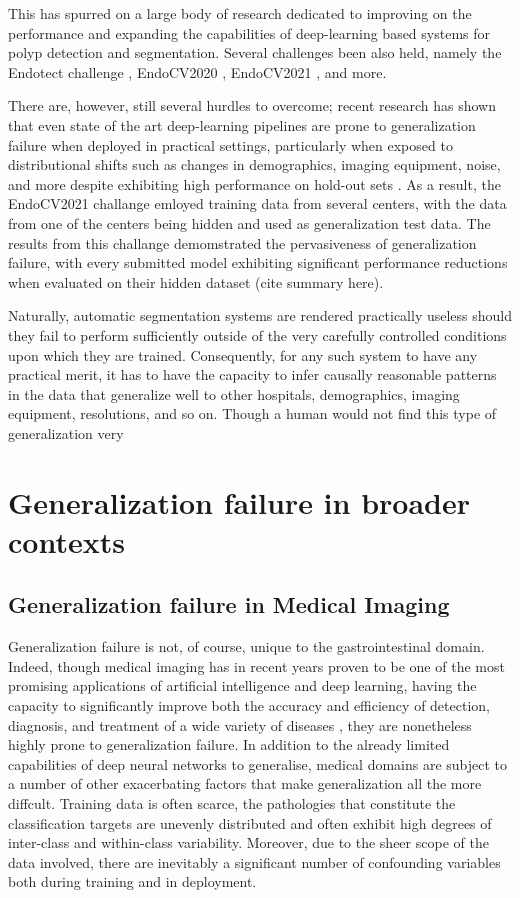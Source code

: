 	This has spurred on a large body of research dedicated to improving on the performance and expanding the capabilities of deep-learning based systems for polyp detection and segmentation. Several challenges been also held, namely the Endotect challenge \cite{endotect}, EndoCV2020 \cite{endocv2020}, EndoCV2021 \cite{endocv2021}, and more.
	
	There are, however, still several hurdles to overcome; recent research has shown that even state of the art deep-learning pipelines are prone to generalization failure when deployed in practical settings, particularly when exposed to distributional shifts such as changes in demographics, imaging equipment, noise, and more despite exhibiting high performance on hold-out sets \cite{retinopathy, damour2020underspecification, pneumonia, shortcut_learning}. As a result, the EndoCV2021 challange emloyed training data from several centers, with the data from one of the centers being hidden and used as generalization test data. The results from this challange demomstrated the pervasiveness of generalization failure, with every submitted model exhibiting significant performance reductions when evaluated on their hidden dataset (cite summary here). 
	
	Naturally, automatic segmentation systems are rendered practically useless should they fail to perform sufficiently outside of the very carefully controlled conditions upon which they are trained. Consequently, for any such system to have any practical merit, it has to have the capacity to infer causally reasonable patterns in the data that generalize well to other hospitals, demographics, imaging equipment, resolutions, and so on. Though a human would not find this type of generalization very 

\section{Generalization failure in broader contexts} \label{case_studies}
	\subsection{Generalization failure in Medical Imaging}
	Generalization failure is not, of course, unique to the gastrointestinal domain. Indeed, though medical imaging has in recent years proven to be one of the most promising applications of artificial intelligence and deep learning, having the capacity to significantly improve both the accuracy and efficiency of detection, diagnosis, and treatment of a wide variety of diseases \cite{dl_medical_imaging}, they are nonetheless highly prone to generalization failure. In addition to the already limited capabilities of deep neural networks to generalise, medical domains are subject to a number of other exacerbating factors that make generalization all the more diffcult. Training data is often scarce, the pathologies that constitute the classification targets are unevenly distributed and often exhibit high degrees of inter-class and within-class variability. Moreover, due to the sheer scope of the data involved, there are inevitably a significant number of confounding variables both during training and in deployment.  
		
